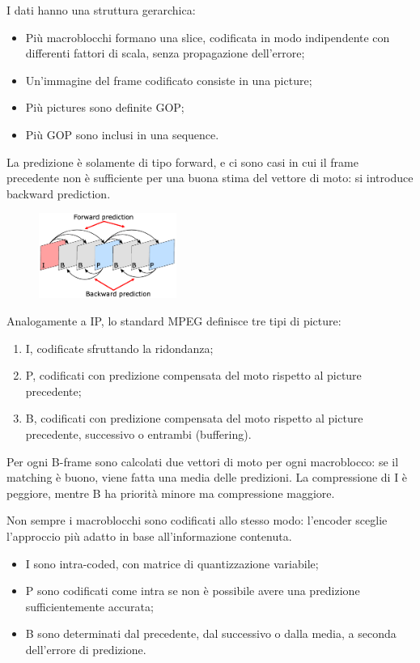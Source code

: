 I dati hanno una struttura gerarchica:
\begin{itemize}
	\item Più macroblocchi formano una slice, codificata in modo indipendente con differenti fattori di scala, senza propagazione dell'errore;
	\item Un'immagine del frame codificato consiste in una picture;
	\item Più pictures sono definite GOP;
	\item Più GOP sono inclusi in una sequence.
\end{itemize}

La predizione è solamente di tipo forward, e ci sono casi in cui il frame precedente non è sufficiente per una buona stima del vettore di moto: si introduce backward prediction.

 \begin{figure}
	\vspace{-10pt}
	\includegraphics[width=0.4\textwidth]{Lezioni/Immagini/ibp}
	\vspace{-30pt}
\end{figure}

Analogamente a IP, lo standard MPEG definisce tre tipi di picture:
\begin{enumerate}
	\item I, codificate sfruttando la ridondanza;
	\item P, codificati con predizione compensata del moto rispetto al picture precedente;
	\item B, codificati con predizione compensata del moto rispetto al picture precedente, successivo o entrambi (buffering).
\end{enumerate}

Per ogni B-frame sono calcolati due vettori di moto per ogni macroblocco: se il matching è buono, viene fatta una media delle predizioni. La compressione di I è peggiore, mentre B ha priorità minore ma compressione maggiore.

Non sempre i macroblocchi sono codificati allo stesso modo: l'encoder sceglie l'approccio più adatto in base all'informazione contenuta.
\begin{itemize}
	\item I sono intra-coded, con matrice di quantizzazione variabile;
	\item P sono codificati come intra se non è possibile avere una predizione sufficientemente accurata;
	\item B sono determinati dal precedente, dal successivo o dalla media, a seconda dell'errore di predizione.
\end{itemize}

